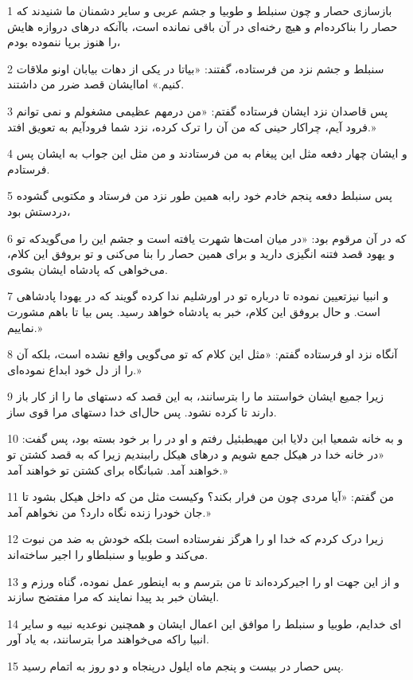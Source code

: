 \par 1 بازسازی حصار و چون سنبلط و طوبیا و جشم عربی و سایر دشمنان ما شنیدند که حصار را بناکرده‌ام و هیچ رخنه‌ای در آن باقی نمانده است، باآنکه درهای دروازه هایش را هنوز برپا ننموده بودم،
\par 2 سنبلط و جشم نزد من فرستاده، گفتند: «بیاتا در یکی از دهات بیابان اونو ملاقات کنیم.» اماایشان قصد ضرر من داشتند.
\par 3 پس قاصدان نزد ایشان فرستاده گفتم: «من درمهم عظیمی مشغولم و نمی توانم فرود آیم، چراکار حینی که من آن را ترک کرده، نزد شما فرودآیم به تعویق افتد.»
\par 4 و ایشان چهار دفعه مثل این پیغام به من فرستادند و من مثل این جواب به ایشان پس فرستادم.
\par 5 پس سنبلط دفعه پنجم خادم خود رابه همین طور نزد من فرستاد و مکتوبی گشوده دردستش بود،
\par 6 که در آن مرقوم بود: «در میان امت‌ها شهرت یافته است و جشم این را می‌گویدکه تو و یهود قصد فتنه انگیزی دارید و برای همین حصار را بنا می‌کنی و تو بروفق این کلام، می‌خواهی که پادشاه ایشان بشوی.
\par 7 و انبیا نیزتعیین نموده تا درباره تو در اورشلیم ندا کرده گویند که در یهودا پادشاهی است. و حال بروفق این کلام، خبر به پادشاه خواهد رسید. پس بیا تا باهم مشورت نماییم.»
\par 8 آنگاه نزد او فرستاده گفتم: «مثل این کلام که تو می‌گویی واقع نشده است، بلکه آن را از دل خود ابداع نموده‌ای.»
\par 9 زیرا جمیع ایشان خواستند ما را بترسانند، به این قصد که دستهای ما را از کار باز دارند تا کرده نشود. پس حال‌ای خدا دستهای مرا قوی ساز.
\par 10 و به خانه شمعیا ابن دلایا ابن مهیطبئیل رفتم و او در را بر خود بسته بود، پس گفت: «در خانه خدا در هیکل جمع شویم و درهای هیکل راببندیم زیرا که به قصد کشتن تو خواهند آمد. شبانگاه برای کشتن تو خواهند آمد.»
\par 11 من گفتم: «آیا مردی چون من فرار بکند؟ وکیست مثل من که داخل هیکل بشود تا جان خودرا زنده نگاه دارد؟ من نخواهم آمد.»
\par 12 زیرا درک کردم که خدا او را هرگز نفرستاده است بلکه خودش به ضد من نبوت می‌کند و طوبیا و سنبلطاو را اجیر ساخته‌اند.
\par 13 و از این جهت او را اجیرکرده‌اند تا من بترسم و به اینطور عمل نموده، گناه ورزم و ایشان خبر بد پیدا نمایند که مرا مفتضح سازند.
\par 14 ‌ای خدایم، طوبیا و سنبلط را موافق این اعمال ایشان و همچنین نوعدیه نبیه و سایر انبیا راکه می‌خواهند مرا بترسانند، به یاد آور.
\par 15 پس حصار در بیست و پنجم ماه ایلول درپنجاه و دو روز به اتمام رسید.
